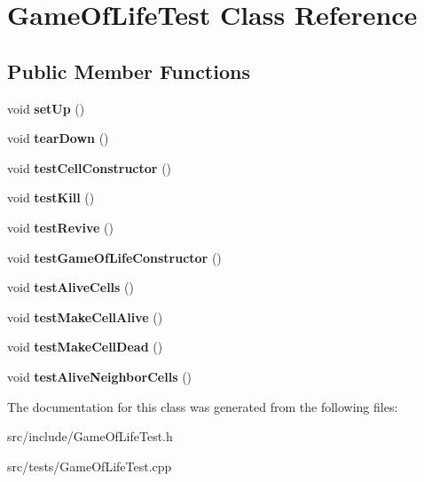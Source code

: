 \hypertarget{class_game_of_life_test}{
\section{GameOfLifeTest Class Reference}
\label{class_game_of_life_test}
}
\subsection*{Public Member Functions}
\begin{DoxyCompactItemize}
\item 
\hypertarget{class_game_of_life_test_a5350c39d94283906b7e0995c6f0e79ea}{
void {\bfseries setUp} ()}
\label{class_game_of_life_test_a5350c39d94283906b7e0995c6f0e79ea}

\item 
\hypertarget{class_game_of_life_test_ae22a9ab0094842cd1d286a92e402b4f5}{
void {\bfseries tearDown} ()}
\label{class_game_of_life_test_ae22a9ab0094842cd1d286a92e402b4f5}

\item 
\hypertarget{class_game_of_life_test_abef593355dabfb2c5bbb223cc7289c15}{
void {\bfseries testCellConstructor} ()}
\label{class_game_of_life_test_abef593355dabfb2c5bbb223cc7289c15}

\item 
\hypertarget{class_game_of_life_test_a49932384a1e064930cee1e78fc43d0c0}{
void {\bfseries testKill} ()}
\label{class_game_of_life_test_a49932384a1e064930cee1e78fc43d0c0}

\item 
\hypertarget{class_game_of_life_test_a41ea084fc636fed7d9b00fff7420c894}{
void {\bfseries testRevive} ()}
\label{class_game_of_life_test_a41ea084fc636fed7d9b00fff7420c894}

\item 
\hypertarget{class_game_of_life_test_a51fbfc093e8a089ce17fd6fc4b07795d}{
void {\bfseries testGameOfLifeConstructor} ()}
\label{class_game_of_life_test_a51fbfc093e8a089ce17fd6fc4b07795d}

\item 
\hypertarget{class_game_of_life_test_a8f6c2c901ad04c6e75b929d2f649f659}{
void {\bfseries testAliveCells} ()}
\label{class_game_of_life_test_a8f6c2c901ad04c6e75b929d2f649f659}

\item 
\hypertarget{class_game_of_life_test_a933d9eb90e762c66242065800e246e9c}{
void {\bfseries testMakeCellAlive} ()}
\label{class_game_of_life_test_a933d9eb90e762c66242065800e246e9c}

\item 
\hypertarget{class_game_of_life_test_a5f180b8d26d824968e8debf755ea92f5}{
void {\bfseries testMakeCellDead} ()}
\label{class_game_of_life_test_a5f180b8d26d824968e8debf755ea92f5}

\item 
\hypertarget{class_game_of_life_test_ac6247685f00b92226f1c2b765ad63dc6}{
void {\bfseries testAliveNeighborCells} ()}
\label{class_game_of_life_test_ac6247685f00b92226f1c2b765ad63dc6}

\end{DoxyCompactItemize}


The documentation for this class was generated from the following files:\begin{DoxyCompactItemize}
\item 
src/include/GameOfLifeTest.h\item 
src/tests/GameOfLifeTest.cpp\end{DoxyCompactItemize}
